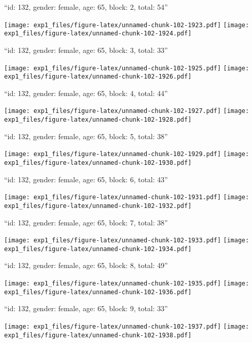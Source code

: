 \documentclass[11pt,,]{article}
\begin{document}
\newpage
[1] 

``id: 132, gender: female, age: 65, block: 2, total: 54''

\texttt{[image: exp1\_files/figure-latex/unnamed-chunk-102-1923.pdf]}
\texttt{[image: exp1\_files/figure-latex/unnamed-chunk-102-1924.pdf]}

\newpage
[1] 

``id: 132, gender: female, age: 65, block: 3, total: 33''

\texttt{[image: exp1\_files/figure-latex/unnamed-chunk-102-1925.pdf]}
\texttt{[image: exp1\_files/figure-latex/unnamed-chunk-102-1926.pdf]}

\newpage
[1] 

``id: 132, gender: female, age: 65, block: 4, total: 44''

\texttt{[image: exp1\_files/figure-latex/unnamed-chunk-102-1927.pdf]}
\texttt{[image: exp1\_files/figure-latex/unnamed-chunk-102-1928.pdf]}

\newpage
[1] 

``id: 132, gender: female, age: 65, block: 5, total: 38''

\texttt{[image: exp1\_files/figure-latex/unnamed-chunk-102-1929.pdf]}
\texttt{[image: exp1\_files/figure-latex/unnamed-chunk-102-1930.pdf]}

\newpage
[1] 

``id: 132, gender: female, age: 65, block: 6, total: 43''

\texttt{[image: exp1\_files/figure-latex/unnamed-chunk-102-1931.pdf]}
\texttt{[image: exp1\_files/figure-latex/unnamed-chunk-102-1932.pdf]}

\newpage
[1] 

``id: 132, gender: female, age: 65, block: 7, total: 38''

\texttt{[image: exp1\_files/figure-latex/unnamed-chunk-102-1933.pdf]}
\texttt{[image: exp1\_files/figure-latex/unnamed-chunk-102-1934.pdf]}

\newpage
[1] 

``id: 132, gender: female, age: 65, block: 8, total: 49''

\texttt{[image: exp1\_files/figure-latex/unnamed-chunk-102-1935.pdf]}
\texttt{[image: exp1\_files/figure-latex/unnamed-chunk-102-1936.pdf]}

\newpage
[1] 

``id: 132, gender: female, age: 65, block: 9, total: 33''

\texttt{[image: exp1\_files/figure-latex/unnamed-chunk-102-1937.pdf]}
\texttt{[image: exp1\_files/figure-latex/unnamed-chunk-102-1938.pdf]}
\end{document}
